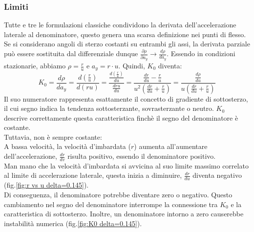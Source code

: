 \subsubsection{Limiti}
Tutte e tre le formulazioni classiche condividono la derivata dell'accelerazione laterale al denominatore, 
questo genera una scarsa definizione nei punti di flesso.\\
Se si considerano angoli di sterzo costanti su entrambi gli assi, la derivata parziale può essere sostituita dal 
differenziale dunque $\frac{\partial \rho}{\partial a_y} \longrightarrow{} \frac{d \rho}{da_y}$. Essendo in condizioni
stazionarie, abbiamo $\rho = \frac{r}{u}$ e $a_y = r \cdot u$. Quindi, $K_0$ diventa:
\begin{equation}
K_0 = 
\frac{d \rho}{da_y} = \frac{d \left( \frac{r}{u} \right)}{d(ru)} = \frac{\frac{d(\frac{r}{u})}{du}}{\frac{dru}{du}} =
\frac{\frac{dr}{du} - \frac{r}{u}}{u^2( \frac{dr}{du} + \frac{r}{u})} =
\frac{\frac{d \rho}{du}}{u( \frac{dr}{du} + \frac{r}{u})}
\end{equation}
Il suo numeratore rappresenta esattamente il concetto di gradiente di sottosterzo, il cui segno indica la tendenza
sottosterzante, sovrasterzante o neutro.
$K_0$ descrive correttamente questa caratteristica finchè il segno del denominatore è costante. \\
Tuttavia, non è sempre costante:\\
A bassa velocità, la velocità d'imbardata ($r$) aumenta all'aumentare dell'accelerazione, $\frac{dr}{dv}$ risulta
positivo, essendo il denominatore positivo. \\
Man mano che la velocità d'imbardata si avvicina al suo limite massimo correlato al limite di accelerazione laterale,
questa inizia a diminuire, $\frac{dr}{du}$ diventa negativo (fig.\ref{fig:r vs u delta=0.145}).\\ 
Di conseguenza, il denominatore potrebbe diventare zero o negativo. Questo cambiamento nel segno del denominatore
interrompe la connessione tra $K_0$ e la caratteristica di sottosterzo. Inoltre, un denominatore intorno a zero causerebbe
instabilità numerica (fig.\ref{fig:K0 delta=0.145}).\\
